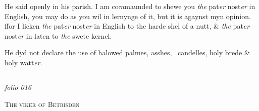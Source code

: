 \documentclass[12pt, a4paper]{book}
\begin{document}
			
		\ifthenelse{\isodd{\thepage}}
		{\reversemarginpar}
		{\normalmarginpar}
		He said openly in his parish. I am co\textit{m}maunded to shewe you \textit{the} pat\textit{er} nost\textit{er} in English, you may do as you wil in lernynge of it, but it is agaynst myn opinion. ffor I licken \textit{the} pat\textit{er} nost\textit{er} in English to the harde shel of a nutt, \& \textit{the} pat\textit{er} nost\textit{er} in laten to \textit{the} swete kernel.
		
		
			
				\marginpar[\vspace{0.5cm}{\textcolor{Gray}{ceremonies}}]{}
			
			
		\ifthenelse{\isodd{\thepage}}
		{\reversemarginpar}
		{\normalmarginpar}
		He dyd not declare the use of halowed palmes, asshes, 
 candelles, holy brede \& holy watt\textit{er}.
		

	
            
\dotfill
						\newpage {} \subsection*{}  \subsection*{}  \subsection*{}  \subsection*{}  \subsection*{}

\textit{folio 016}


            
            	
				\begin{center} \begin{large} {\scshape The viker of Betrisden} \end{large} \end{center}
			
\end{document}
